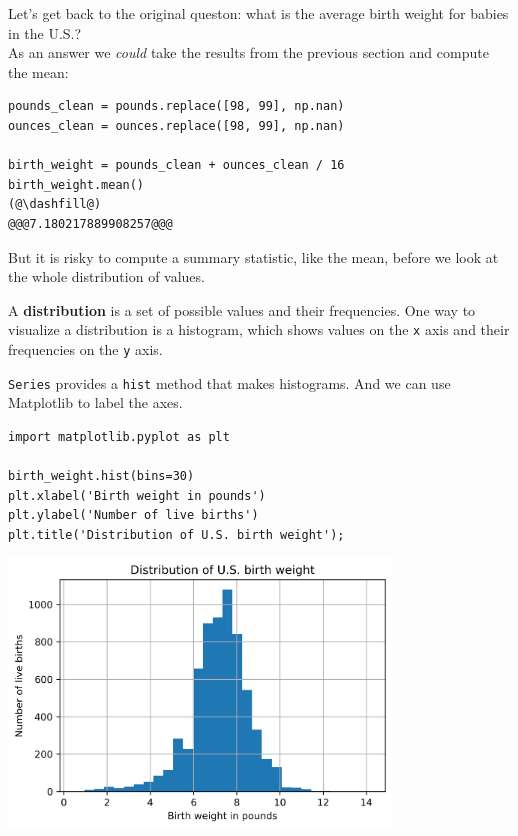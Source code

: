 Let's get back to the original queston: what is the average birth weight
for babies in the U.S.?\\
As an answer we \emph{could} take the results from the previous section
and compute the mean:

\begin{lstlisting}[]
pounds_clean = pounds.replace([98, 99], np.nan)
ounces_clean = ounces.replace([98, 99], np.nan)

birth_weight = pounds_clean + ounces_clean / 16
birth_weight.mean()
(@\dashfill@)
@@@7.180217889908257@@@
\end{lstlisting}

But it is risky to compute a summary statistic, like the mean, before we
look at the whole distribution of values.

A \textbf{distribution} is a set of possible values and their
frequencies. One way to visualize a distribution is a histogram, which
shows values on the \passthrough{\lstinline!x!} axis and their
frequencies on the \passthrough{\lstinline!y!} axis.

\passthrough{\lstinline!Series!} provides a
\passthrough{\lstinline!hist!} method that makes histograms. And we can
use Matplotlib to label the axes.

\begin{lstlisting}[]
import matplotlib.pyplot as plt

birth_weight.hist(bins=30)
plt.xlabel('Birth weight in pounds')
plt.ylabel('Number of live births')
plt.title('Distribution of U.S. birth weight');
\end{lstlisting}

\begin{center}
\includegraphics[width=4in]{07_dataframes_files/07_dataframes_59_0.png}
\end{center}

